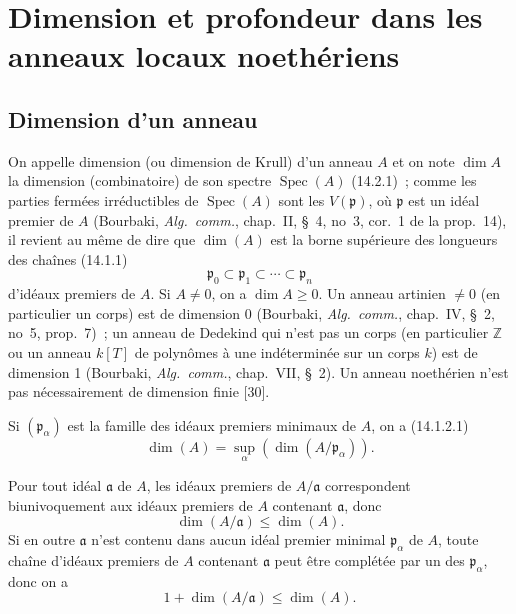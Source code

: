 \section{Dimension et profondeur dans les anneaux locaux noethériens}
\label{section:0.16-fr}

\subsection{Dimension d'un anneau}
\label{subsection:0.16.1-fr}

\begin{env}[16.1.1]
\label{0.16.1.1-fr}
On appelle dimension (ou dimension de Krull) d'un anneau $A$ et on note
$\dim A$ la dimension (combinatoire) de son spectre
$\operatorname{Spec}(A)$ (14.2.1)~; comme les parties fermées irréductibles de
$\operatorname{Spec}(A)$ sont les
$V(\mathfrak{p})$, où $\mathfrak{p}$ est un idéal premier de $A$ (Bourbaki,
\emph{Alg.~comm.}, chap.~II, \S~4, no~3, cor.~1 de la prop.~14), il revient au
même de dire que $\dim(A)$ est la borne supérieure des longueurs des chaînes
(14.1.1)
\[
  \mathfrak{p}_0\subset\mathfrak{p}_1\subset\cdots\subset\mathfrak{p}_n
\]
d'idéaux premiers de $A$. Si $A\neq0$, on a $\dim A\geq0$. Un anneau artinien
$\neq0$ (en particulier un corps) est de dimension 0 (Bourbaki,
\emph{Alg.~comm.}, chap.~IV, \S~2, no~5, prop.~7)~; un anneau de Dedekind qui
n'est pas un corps (en particulier $\mathbb{Z}$ ou un anneau $k[T]$ de
polynômes à une indéterminée sur un corps $k$) est de dimension 1 (Bourbaki,
\emph{Alg.~comm.}, chap.~VII, \S~2). Un anneau noethérien n'est pas
nécessairement de dimension finie [30].

Si $(\mathfrak{p}_\alpha)$ est la famille des idéaux premiers minimaux de $A$,
on a (14.1.2.1)
\[
\label{0.16.1.1.1-fr}
  \dim(A)=\sup_\alpha(\dim(A/\mathfrak{p}_\alpha)).
\tag{16.1.1.1}
\]
\end{env}

\begin{env}[16.1.2]
\label{0.16.1.2-fr}
Pour tout idéal $\mathfrak{a}$ de $A$, les idéaux premiers de
$A/\mathfrak{a}$ correspondent biunivoquement aux idéaux premiers de $A$
contenant $\mathfrak{a}$, donc
\[
\label{0.16.1.2.1-fr}
  \dim(A/\mathfrak{a})\leq\dim(A).
\tag{16.1.2.1}
\]
Si en outre $\mathfrak{a}$ n'est contenu dans aucun idéal premier minimal
$\mathfrak{p}_\alpha$ de $A$, toute chaîne d'idéaux premiers de $A$ contenant
$\mathfrak{a}$ peut être complétée par un des $\mathfrak{p}_\alpha$, donc on a
\[
\label{0.16.1.2.2-fr}
  1+\dim(A/\mathfrak{a})\leq\dim(A).
\tag{16.1.2.2}
\]
\end{env}

